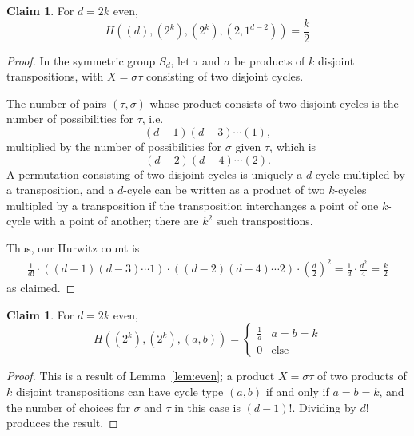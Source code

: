 \documentclass[thesis]{thesis-umich}           %
\theoremstyle{definition}
\newtheorem{claim}[thm]{Claim}
\begin{document}
\begin{claim}
  \label{claim:twoscomplete}
For $d=2k$ even,
\[
H((d),(2^k),(2^k),(2,1^{d-2}))=\frac k2
\]
\end{claim}
\begin{proof}
  In the symmetric group $S_d$, let $\tau$ and $\sigma$
  be products of $k$ disjoint transpositions, with $X=\sigma\tau$ consisting
  of two disjoint cycles.

  
  The number of pairs $(\tau,\sigma)$ whose product consists of two
  disjoint cycles is the number of possibilities for $\tau$, i.e.
  \[
  (d-1)(d-3)\cdots (1),
  \]
  multiplied by the number of possibilities for $\sigma$ given $\tau$, which is
  \[
  (d-2)(d-4)\cdots (2).\]
  A permutation consisting of two disjoint cycles
  is uniquely a $d$-cycle multipled by a transposition, and
  a $d$-cycle can be written as a product of two $k$-cycles multipled by a
  transposition if the transposition interchanges a point of one $k$-cycle
  with a point of another; there are $k^2$ such transpositions.

  Thus, our Hurwitz count is
  \begin{align*}
  \frac 1{d!}\cdot ((d-1)(d-3)\cdots 1)\cdot  ((d-2)(d-4)\cdots 2)\cdot\left(\frac d2\right)^2 = \frac{1}{d}\cdot\frac{d^2}{4}=\frac k2
  \end{align*}
  as claimed.
\end{proof}

\begin{claim}
  \label{claim:twoscycles}
  For $d=2k$ even,
  \[
  H((2^k),(2^k),(a,b))=\begin{cases}
  \frac 1d & a=b=k \\
  0 & \text{else}
  \end{cases}
  \]
\end{claim}
\begin{proof}
  This is a result of Lemma~\ref{lem:even};
  a product $X=\sigma\tau$ of two products of $k$
  disjoint transpositions can have cycle type $(a,b)$
  if and only if $a=b=k$, and the number of choices for $\sigma$ and
  $\tau$ in this case is
  $(d-1)!$. Dividing by $d!$ produces the result.
  \end{proof}
\end{document}
